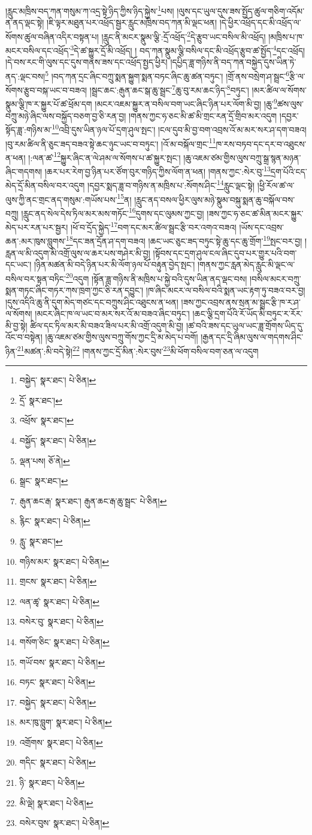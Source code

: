 །རླུང་མཁྲིས་བད་ཀན་གསུམ་ཀ་འདྲ་སྟེ་ཉིད་ཀྱིས་ཉིད་སྐྱེས་\footnote{བསྐྱེད་  སྣར་ཐང་།  པེ་ཅིན། }པས། །ལུས་དང་ཡུལ་དུས་ཟས་སྤྱོད་ཚུལ་གཅིག་འདོམ་ན་ནད་ལྡང་སྟེ། །ཇི་ལྟར་མཐུན་པར་འཕྲོད་སྦྱར་རླུང་མཁྲིས་བད་ཀན་མི་ལྡང་ཕན། །དེ་ཕྱིར་འཕྲོད་དང་མི་འཕྲོད་ལ་སོགས་ཚུལ་བཞིན་འདིར་བསྟན་པ། །རླུང་ནི་མངར་སྣུམ་ལྕི་:དྲོ་འཕྲོད་\footnote{དྲོ་  སྣར་ཐང་། }དེ་རྩུབ་ཡང་བསིལ་མི་འཕྲོད། །མཁྲིས་པ་ཁ་མངར་བསིལ་དང་འཕྲོད་\footnote{འཕྲོས་  སྣར་ཐང་། }དེ་ཚ་སྐྱུར་དྲོ་མི་འཕྲོད། །
བད་ཀན་སྣུམ་ལྕི་བསིལ་དང་མི་འཕྲོད་རྩུབ་ཚ་སྤྱོད་\footnote{བསྐྱོད་  སྣར་ཐང་།  པེ་ཅིན། }དང་འཕྲོད། །དེ་བས་རང་གི་ལུས་དང་དུས་གནས་ཟས་དང་འཕྲོད་སྤྱད་ཕྱིར། །དཔྱིད་ཟླ་གཉིས་ནི་བད་ཀན་བསྐྱེད་དུས་ཡིན་ཏེ་ནད་:ལྡང་བས།\footnote{ལྡན་པས།  ཅོ་ནེ། } །བད་ཀན་དྲང་ཞིང་བཀྲུ་སྨན་སྐྱུག་སྨན་བཏང་ཞིང་ཆུ་ཚན་བཏུང་། །གྲོ་ནས་བསྲེག་ཤ་སྦྲང་\footnote{སྒྲང་  སྣར་ཐང་། }རྩི་ལ་སོགས་རྩུབ་བསྐ་ཡང་བ་བཟའ། །སྦྲང་ཆང་:རྒུན་ཆང་སྒ་ཆུ་སྦྲང་\footnote{རྒུན་ཆང་རྒ་  སྣར་ཐང་། རྒུན་ཆང་རྒ་ཆུ་སྦྲང་  པེ་ཅིན། }ཆུ་བུ་རམ་ཆང་ཉིད་\footnote{རྙིང་  སྣར་ཐང་།  པེ་ཅིན། }བཏུང་། །མར་ཚིལ་ལ་སོགས་སྣུམ་ལྕི་ཁ་ར་སྐྱུར་པོ་ཚ་ཕྲོམ་དག །མངར་འཇམ་སྐྱུར་ན་བསིལ་བག་ཡང་ཞིང་ཉིན་པར་ལོག་མི་བྱ། །ཆུ་\footnote{རླུ་  སྣར་ཐང་། }ཚས་ལུས་བཀྲུ་མཉེ་ཞིང་ལས་བསྐྱོད་བཅག་བྱ་ཅི་རན་བྱ། །གནས་ཀྱང་ཧ་ཅང་མི་ཚ་མི་གྲང་རན་དྲོ་གྲིབ་མར་འདུག །དབྱར་སྟོད་ཟླ་:གཉིས་མ་\footnote{གཉིས་མར་  སྣར་ཐང་།  པེ་ཅིན། }འབྲི་དུས་ཡིན་ཉལ་པོ་དྲག་ཤུལ་སྤང་། །ངལ་དུབ་མི་བྱ་བག་འབྲས་འོ་མ་མར་སར་ཤ་དག་བཟའ། །བུ་རམ་ཚིལ་ནི་ཅུང་ཟད་བཟའ་སྟེ་ཆང་ཉུང་ཡང་བ་བཏུང་། །འོ་མ་བསྐོལ་གྲང་\footnote{གྲངས་  སྣར་ཐང་།  པེ་ཅིན། }ཁ་རས་བཏབ་དང་དར་བ་འཐུངས་ན་ཕན། །:ལན་ཚ་\footnote{ལན་ཚྭ་  སྣར་ཐང་།  པེ་ཅིན། }སྐྱུར་ཞིང་ན་ལེ་ཤམ་ལ་སོགས་པ་ཚ་སྐྱུར་སྤང་། །ཆུ་འཇམ་ཙམ་གྱིས་ལུས་བཀྲུ་སྒྲ་སྙན་མཉན་ཞིང་གདགས། །ཆར་པར་རེག་བྱ་ཉིན་པར་ཙོག་བུར་གཉིད་ཀྱིས་ལོག་ན་ཕན། །གནས་ཀྱང་:སེར་བུ་\footnote{བསེར་བུ་  སྣར་ཐང་།  པེ་ཅིན། }དྲག་པོའི་ངད་མེད་དྲོ་མིན་བསིལ་བར་འདུག །དབྱར་སྨད་ཟླ་བ་གཉིས་ན་མཁྲིས་པ་:སོགས་ཤིང་\footnote{གསོག་ཅིང་  སྣར་ཐང་།  པེ་ཅིན། }རླུང་ལྡང་སྟེ། །ཕྱི་རོལ་ཚ་ལ་ལུས་ཀྱི་ནང་གྲང་ནད་གསུམ་:གཡོས་པས་\footnote{གཡོ་བས་  སྣར་ཐང་།  པེ་ཅིན། }ན། །རླུང་ནད་བསལ་ཕྱིར་ལུས་མཉེ་སྣུམ་བསྐུ་སྨན་ཆུ་བསྐོལ་བས་བཀྲུ། །རླུང་ནད་སེལ་དེས་ཏིལ་མར་མས་གཏོང་\footnote{བཏང་  སྣར་ཐང་།  པེ་ཅིན། }དུགས་དང་ལུམས་ཀྱང་བྱ། །ཟས་ཀྱང་ཧ་ཅང་ཚ་མིན་མངར་སྐྱུར་མེད་པར་རན་པར་སྦྱར། །ཕོ་བ་དྲོད་སྐྱེད་\footnote{བསྐྱེད་  སྣར་ཐང་།  པེ་ཅིན། }བག་དང་མར་ཚིལ་སྦྲང་རྩི་བར་འགའ་བཟའ། །ཡོས་དང་འབྲས་ཆན་:མར་ཁུས་བླུགས་\footnote{མར་ཁུ་བླུག་  སྣར་ཐང་།  པེ་ཅིན། }དང་ཟན་དྲོན་ཤ་དག་བཟའ། །ཆང་ཡང་ཅུང་ཟད་བཏུང་སྟེ་ཆུ་དང་ཆུ་གྲོག་\footnote{འགྲོགས་  སྣར་ཐང་།  པེ་ཅིན། }སྤང་བར་བྱ། །རླན་ལ་མི་འདུག་མི་འགྲོ་ལུས་ལ་ཆར་པས་གཤེར་མི་བྱ། །སྟོབས་དང་དྲག་ཤུལ་ངལ་ཞིང་དུབ་པར་གྱུར་པའི་བག་དང་ཡང་། །ཉིན་མཚན་མི་བདེ་ཉིན་པར་མི་ལོག་ཉལ་པོ་བརྟུན་བྱེད་སྤང་། །གནས་ཀྱང་རླན་མེད་རླུང་མི་ལྡང་ལ་བསིལ་བར་སྟན་བཏིང་\footnote{གདིང་  སྣར་ཐང་།  པེ་ཅིན། }འདུག །སྟོན་ཟླ་གཉིས་ནི་མཁྲིས་པ་སྐྱེ་བའི་དུས་ཡིན་ནད་ལྡང་བས། །བསིལ་མངར་བཀྲུ་སྨན་གཏང་ཞིང་གཏར་ཀས་ཁྲག་ཀྱང་ཅི་རན་དབྱུང་། །ཁ་ཞིང་མངར་ལ་བསིལ་བའི་སྨན་ཡང་རྟག་ཏུ་བཟའ་བར་བྱ། །དུས་འདིའི་ཆུ་ནི་དུག་མེད་གཙང་དང་བཀྲུས་ཤིང་འཐུངས་ན་ཕན། །ཟས་ཀྱང་འབྲས་ནས་སྲན་མ་སྦྲང་རྩི་ཁ་ར་ཤ་ལ་སོགས། །མངར་ཞིང་ཁ་ལ་ཡང་བ་མར་སར་འོ་མ་བཟའ་ཞིང་བཏུང་། །ཆང་ལྕི་དྲག་པོའི་རོ་ཡོད་མི་བཏུང་ར་རོར་མི་བྱ་སྟེ། ཚིལ་དང་ཏིལ་མར་མི་བཟའ་ཟིལ་པར་མི་འགྲོ་འདུག་མི་བྱ། །ཚ་བའི་ཟས་དང་ཡུལ་ཡང་ཟླ་གྲོགས་ཡིད་དུ་འོང་བ་བསྟེན། །ཆུ་འཇམ་ཙམ་གྱིས་ལུས་བཀྲུ་གོས་ཀྱང་དྲི་མ་མེད་པ་བགོ། །རྒྱན་དང་དྲི་ཞིམ་ལུས་ལ་གདགས་ཤིང་ཉིན་\footnote{ཉི་  སྣར་ཐང་།  པེ་ཅིན། }མཚན་:མི་བདེ་སྟེ།\footnote{མི་ལྡེ།  སྣར་ཐང་།  པེ་ཅིན། } །གནས་ཀྱང་དྲོ་མིན་:སེར་བུས་\footnote{བསེར་བུས་  སྣར་ཐང་།  པེ་ཅིན། }མི་ཕོག་བསིལ་བག་ཅན་ལ་འདུག 